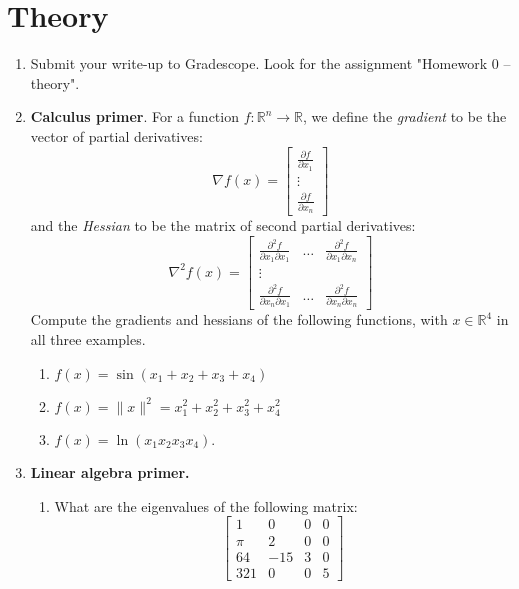 \documentclass[11pt]{amsart}
\begin{document}
\section{Theory}
\begin{enumerate}
	\item Submit your write-up to Gradescope. Look for the assignment "Homework 0 -- theory".

\item {\bf Calculus primer}. For a function $f:\mathbb{R}^n \rightarrow \mathbb{R}$, we define the 
{\it gradient} to be the vector of partial derivatives: 
\[
\nabla f(x) = \begin{bmatrix} \frac{\partial f}{\partial x_1} \\ \vdots \\ \frac{\partial f}{\partial x_n}\end{bmatrix}
\]
and the {\it Hessian} to be the matrix of second partial derivatives: 
\[
\nabla^2 f(x) = 
\begin{bmatrix} \frac{\partial^2 f}{\partial x_1 \partial x_1}  & \dots & \frac{\partial^2 f}{\partial x_1 \partial x_n}
\\ \vdots 
\\ \frac{\partial^2 f}{\partial x_n \partial x_1} & \dots & \frac{\partial^2 f}{\partial x_n \partial x_n}\end{bmatrix}
\]
Compute the gradients and hessians of the following functions, with $x \in \mathbb{R}^4$ in all three examples. 
\begin{enumerate}
\item $f(x) = \sin(x_1 + x_2 + x_3 + x_4)$ \\
\item $f(x) = \|x\|^2 = x_1^2 + x_2^2 + x_3^2 + x_4^2$\\
\item $f(x) = \ln(x_1x_2x_3x_4)$.  
\end{enumerate}

\newpage

\item {\bf Linear algebra primer.}
\begin{enumerate}
\item What are the eigenvalues of the following matrix: 
\[
\begin{bmatrix}
1 & 0 & 0 & 0 \\
\pi & 2 & 0 & 0 \\
64 & -15 & 3 & 0 \\ 
321 & 0 & 0 & 5 
\end{bmatrix}
\]


\end{enumerate}
\end{enumerate}
\end{document}
